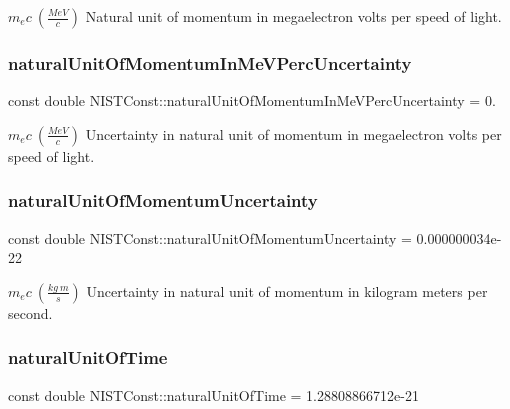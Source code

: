 $m_e c \ (\frac{MeV}{c})$ Natural unit of momentum in megaelectron volts per speed of light. \mbox{\label{group___natural_unit_ga50e4b860397c307791bc2786590f5291}} 
\subsubsection{\texorpdfstring{natural\+Unit\+Of\+Momentum\+In\+Me\+V\+Perc\+Uncertainty}{naturalUnitOfMomentumInMeVPercUncertainty}}
{\footnotesize\ttfamily const double N\+I\+S\+T\+Const\+::natural\+Unit\+Of\+Momentum\+In\+Me\+V\+Perc\+Uncertainty = 0.}

$m_e c \ (\frac{MeV}{c})$ Uncertainty in natural unit of momentum in megaelectron volts per speed of light. \mbox{\label{group___natural_unit_ga3a03830abcca1d155f419d616a5b15f0}} 
\subsubsection{\texorpdfstring{natural\+Unit\+Of\+Momentum\+Uncertainty}{naturalUnitOfMomentumUncertainty}}
{\footnotesize\ttfamily const double N\+I\+S\+T\+Const\+::natural\+Unit\+Of\+Momentum\+Uncertainty = 0.\+000000034e-\/22}

$m_e c \ (\frac{kg\ m}{s})$ Uncertainty in natural unit of momentum in kilogram meters per second. \mbox{\label{group___natural_unit_ga20f1d962c5213c24d1350ee6a64e3a67}} 
\subsubsection{\texorpdfstring{natural\+Unit\+Of\+Time}{naturalUnitOfTime}}
{\footnotesize\ttfamily const double N\+I\+S\+T\+Const\+::natural\+Unit\+Of\+Time = 1.\+28808866712e-\/21}

